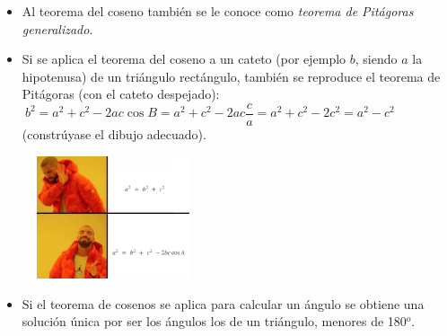 \vspace{-2mm}
\begin{multicols}{2}

\begin{itemize}
\vspace{-2mm}\item Al teorema del coseno también se le conoce como \emph{teorema de Pitágoras generalizado}.
\vspace{-2mm}\item \begin{small} Si se aplica el teorema del coseno a un cateto (por ejemplo $b$, siendo $a$ la hipotenusa) de un triángulo rectángulo, también se reproduce el teorema de Pitágoras (con el cateto despejado): 
$\ b^2=a^2+c^2-2ac\cos B=a^2+c^2-2ac  \dfrac{c}{a}=a^2+c^2-2c^2=a^2-c^2$ (constrúyase el dibujo adecuado).\end{small}
\end{itemize}

\begin{figure}[H]
	\centering
	\includegraphics[width=0.4\textwidth]{img-triang/triang03.png}
\end{figure}

\end{multicols}

\begin{itemize}
\item Si el teorema de cosenos se aplica para calcular un ángulo se obtiene una solución única por ser los ángulos los de un triángulo, menores de 180$^o$.	
\end{itemize}


